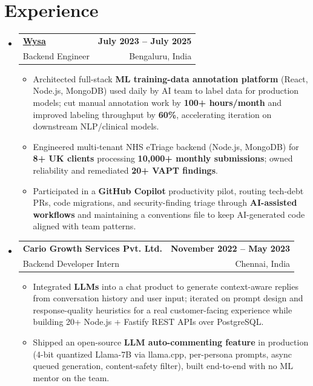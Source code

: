 \documentclass[letterpaper,10pt]{article}
\makeatletter
\newcommand{\resumeItem}[1]{
  \item\small{#1\vspace{-1pt}}
}
\newcommand{\resumeSubheading}[4]{
  \vspace{1pt}\item
    \begin{tabular*}{0.985\textwidth}[t]{l@{\extracolsep{\fill}}r}
      \textbf{#1} & \textbf{\small #2} \\
      {\small\color{ResumeSlate} #3} & {\small\color{ResumeSlate} #4} \\
    \end{tabular*}\vspace{-6pt}
}
\newcommand{\resumeSubHeadingListStart}{\begin{itemize}[leftmargin=0.0in, label={}, itemsep=2pt, topsep=2pt]}
\newcommand{\resumeSubHeadingListEnd}{\end{itemize}}
\newcommand{\resumeItemListStart}{\begin{itemize}[leftmargin=0.18in, itemsep=2pt, topsep=1pt]}
\newcommand{\resumeItemListEnd}{\end{itemize}\vspace{-4pt}}
\makeatother
\begin{document}
\section{Experience}
\resumeSubHeadingListStart
  \resumeSubheading
    {\href{https://www.wysa.io}{Wysa}}{July 2023 -- July 2025}
    {Backend Engineer}{Bengaluru, India}
    \resumeItemListStart
      \resumeItem{Architected full-stack \textbf{ML training-data annotation platform} (React, Node.js, MongoDB) used daily by AI team to label data for production models; cut manual annotation work by \textbf{100+ hours/month} and improved labeling throughput by \textbf{60\%}, accelerating iteration on downstream NLP/clinical models.}
      \resumeItem{Engineered multi-tenant NHS eTriage backend (Node.js, MongoDB) for \textbf{8+ UK clients} processing \textbf{10{,}000+ monthly submissions}; owned reliability and remediated \textbf{20+ VAPT findings}.}
      \resumeItem{Participated in a \textbf{GitHub Copilot} productivity pilot, routing tech-debt PRs, code migrations, and security-finding triage through \textbf{AI-assisted workflows} and maintaining a conventions file to keep AI-generated code aligned with team patterns.}
    \resumeItemListEnd
  \resumeSubheading
    {Cario Growth Services Pvt. Ltd.}{November 2022 -- May 2023}
    {Backend Developer Intern}{Chennai, India}
    \resumeItemListStart
      \resumeItem{Integrated \textbf{LLMs} into a chat product to generate context-aware replies from conversation history and user input; iterated on prompt design and response-quality heuristics for a real customer-facing experience while building 20+ Node.js + Fastify REST APIs over PostgreSQL.}
      \resumeItem{Shipped an open-source \textbf{LLM auto-commenting feature} in production (4-bit quantized Llama-7B via llama.cpp, per-persona prompts, async queued generation, content-safety filter), built end-to-end with no ML mentor on the team.}
    \resumeItemListEnd
\resumeSubHeadingListEnd
\vspace{-4pt}
\end{document}

